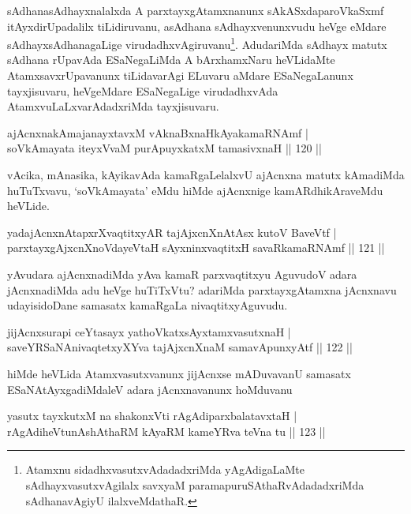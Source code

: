 \begin{artha}
sAdhanasAdhayxnalalxda A parxtayxgAtamxnanunx sAkASxdaparoVkaSxmf itAyxdirUpadalilx tiLidiruvanu, asAdhana sAdhayxvenunxvudu heVge eMdare sAdhayxsAdhanagaLige virudadhxvAgiruvanu\footnote[1]{Atamxnu sidadhxvasutxvAdadadxriMda yAgAdigaLaMte sAdhayxvasutxvAgilalx savxyaM paramapuruSAthaRvAdadadxriMda sAdhanavAgiyU ilalxveMdathaR.}. AdudariMda sAdhayx matutx sAdhana rUpavAda ESaNegaLiMda A bArxhamxNaru heVLidaMte AtamxsavxrUpavanunx tiLidavarAgi ELuvaru aMdare ESaNegaLanunx tayxjisuvaru, heVgeMdare ESaNegaLige virudadhxvAda AtamxvuLaLxvarAdadxriMda tayxjisuvaru.
\end{artha}

\begin{shl}
ajAcnxnakAmajanayxtavxM vAknaBxnaHkAyakamaRNAmf |\\
soV\s kAmayata iteyxVvaM purA\s puyxkatxM tamasivxnaH \hfill || 120 ||
\end{shl}

\begin{artha}%
vAcika, mAnasika, kAyikavAda kamaRgaLelalxvU ajAcnxna matutx kAmadiMda huTuTxvavu, `soV\s kAmayata' eMdu hiMde ajAcnxnige kamARdhikAraveMdu heVLide.
\end{artha}

\begin{shl}
yadajAcnxnAtapxrXvaqtitxyAR tajAjxcnXnAtAsx kutoV BaveVtf |\\
parxtayxgAjxcnXnoVdayeV\s taH sAyxninxvaqtitxH savaRkamaRNAmf \hfill || 121 ||
\end{shl}

\begin{artha}
yAvudara ajAcnxnadiMda yAva kamaR parxvaqtitxyu AguvudoV adara jAcnxnadiMda adu heVge huTiTxVtu? adariMda parxtayxgAtamxna jAcnxnavu udayisidoDane samasatx kamaRgaLa nivaqtitxyAguvudu.
\end{artha}

\begin{shl}
jijAcnxsurapi ceYtasayx yathoVkatxsAyx\s \s tamxvasutxnaH |\\
saveYRSaNAnivaqtetxyXYva tajAjxcnXnaM samavApunxyAtf \hfill || 122 ||
\end{shl}

\begin{artha}
hiMde heVLida Atamxvasutxvanunx jijAcnxse mADuvavanU samasatx ESaNAtAyxgadiMdaleV adara jAcnxnavanunx hoMduvanu
\end{artha}

\begin{shl}
yasutx tayxkutxM na shakonxVti rAgAdiparxbalatavxtaH |\\
rAgAdiheVtunAshAthaRM kAyaRM kameYRva teVna tu \hfill || 123 ||
\end{shl}

